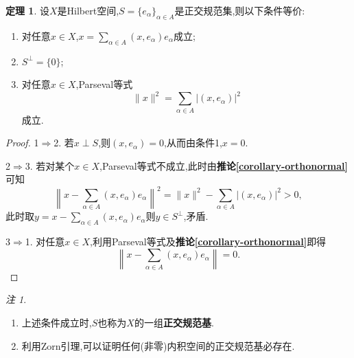 \documentclass{ctexart}
\theoremstyle{definition}
\newtheorem{theorem}{定理}
\theoremstyle{remark}
\newtheorem*{remark}{注}
\newcommand\cororef[1]{\textbf{推论\ref{#1}}}
\begin{document}
	\begin{theorem}
		设$X$是Hilbert空间,$S=\{e_\alpha\}_{\alpha\in A}$是正交规范集,则以下条件等价:
		\begin{enumerate}
			\item 对任意$x\in X$,$x=\sum_{\alpha\in A}{(x,e_\alpha)e_\alpha}$成立;
			\item $S^\perp=\{0\}$;
			\item 对任意$x\in X$,Parseval等式
			$$\|x\|^2=\sum_{\alpha\in A}{|(x,e_\alpha)|^2}$$
			成立.
		\end{enumerate}
	\end{theorem}
	\begin{proof}
		1$\Rightarrow$2. 若$x\perp S$,则$(x,e_\alpha)=0$,从而由条件1,$x=0$.
		
		2$\Rightarrow$3. 若对某个$x\in X$,Parseval等式不成立,此时由\cororef{corollary-orthonormal}可知
		$$\left\|x-\sum_{\alpha\in A}{(x,e_\alpha)e_\alpha}\right\|^2=\|x\|^2-\sum_{\alpha\in A}{|(x,e_\alpha)|^2}>0,$$
		此时取$y=x-\sum_{\alpha\in A}{(x,e_\alpha)e_\alpha}$则$y\in S^\perp$,矛盾.
		
		3$\Rightarrow$1. 对任意$x\in X$,利用Parseval等式及\cororef{corollary-orthonormal}即得
		$$\left\|x-\sum_{\alpha\in A}{(x,e_\alpha)e_\alpha}\right\|=0.$$
	\end{proof}
	\begin{remark}
		\begin{enumerate}
			\item 上述条件成立时,$S$也称为$X$的一组\textbf{正交规范基}.
			\item 利用Zorn引理,可以证明任何(非零)内积空间的正交规范基必存在.
		\end{enumerate}
	\end{remark}
	
\end{document}
